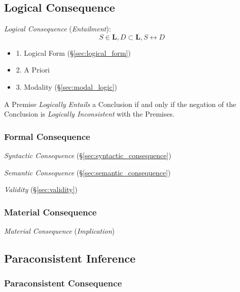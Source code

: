 \subsection{Logical Consequence}\label{sec:logical_consequence}
\cite{beall-restall05}

\emph{Logical Consequence} (\emph{Entailment}):
\[
  S \in \mathbf{L}, D \subset \mathbf{L}, S \leftrightarrow D
\]
\begin{itemize}
  \item 1. Logical Form (\S\ref{sec:logical_form})
  \item 2. A Priori
  \item 3. Modality (\S\ref{sec:modal_logic})
\end{itemize}

A Premise \emph{Logically Entails} a Conclusion if and only if the
negation of the Conclusion is \emph{Logically Inconsistent} with the
Premises.



\subsubsection{Formal Consequence}\label{sec:formal_consequence}

\emph{Syntactic Consequence} (\S\ref{sec:syntactic_consequence})

\emph{Semantic Consequence} (\S\ref{sec:semantic_consequence})

\emph{Validity} (\S\ref{sec:validity})



\subsubsection{Material Consequence}

\emph{Material Consequence} (\emph{Implication})



\subsection{Paraconsistent Inference}\label{sec:paraconsistent_inference}
\cite{priest-tanaka-weber13}

\subsubsection{Paraconsistent Consequence}\label{sec:paraconsistent_consequence}

